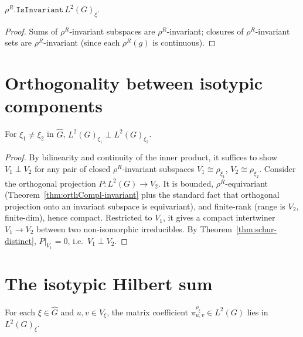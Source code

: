 \begin{theorem}
  \label{thm:isotypic-invariant}
  $\rho^R.\texttt{IsInvariant}\, L^2(G)_\xi$.
\end{theorem}

\begin{proof}
  Sums of $\rho^R$-invariant subspaces are $\rho^R$-invariant; closures
  of $\rho^R$-invariant sets are $\rho^R$-invariant (since each $\rho^R(g)$
  is continuous).
\end{proof}

\section{Orthogonality between isotypic components}

\begin{theorem}
  \label{thm:isotypic-orthog}
  For $\xi_1 \neq \xi_2$ in $\widehat G$, $L^2(G)_{\xi_1} \perp L^2(G)_{\xi_2}$.
\end{theorem}

\begin{proof}
  By bilinearity and continuity of the inner product, it suffices to show
  $V_1 \perp V_2$ for any pair of closed $\rho^R$-invariant subspaces
  $V_1 \cong \rho_{\xi_1}$, $V_2 \cong \rho_{\xi_2}$.
  Consider the orthogonal projection $P : L^2(G) \to V_2$. It is bounded,
  $\rho^R$-equivariant (Theorem~\ref{thm:orthCompl-invariant} plus
  the standard fact that orthogonal projection onto an invariant subspace
  is equivariant), and finite-rank (range is $V_2$, finite-dim), hence
  compact. Restricted to $V_1$, it gives a compact intertwiner
  $V_1 \to V_2$ between two non-isomorphic irreducibles. By
  Theorem~\ref{thm:schur-distinct}, $P|_{V_1} = 0$, i.e.\ $V_1 \perp V_2$.
\end{proof}

\section{The isotypic Hilbert sum}

\begin{theorem}
  \label{thm:mc-in-isotypic}
  For each $\xi \in \widehat G$ and $u, v \in V_\xi$, the matrix
  coefficient $\pi_{u, v}^{\rho_\xi} \in L^2(G)$ lies in $L^2(G)_\xi$.
\end{theorem}

